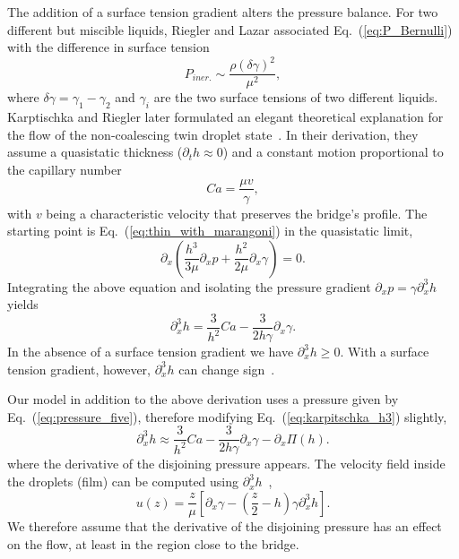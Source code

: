 The addition of a surface tension gradient alters the pressure balance.
For two different but miscible liquids, Riegler and Lazar associated Eq.~(\ref{eq:P_Bernulli}) with the difference in surface tension~\cite{doi:10.1021/la800630w}
\begin{equation}\label{eq:P_bernulli_riegler}
    P_{iner.} \sim \frac{\rho (\delta\gamma)^2}{\mu^2}, 
\end{equation}
where $\delta\gamma = \gamma_1 - \gamma_2$ and $\gamma_i$ are the two surface tensions of two different liquids. 
Karptischka and Riegler later formulated an elegant theoretical explanation for the flow of the non-coalescing twin droplet state~\cite{PhysRevLett.109.066103}.
In their derivation, they assume a quasistatic thickness ($\partial_t h \approx 0$) and a constant motion proportional to the capillary number 
\begin{equation}\label{eq:sys_cap_vel}
    Ca = \frac{\mu v}{\gamma},
\end{equation} 
with $v$ being a characteristic velocity that preserves the bridge's profile. 
The starting point is Eq.~(\ref{eq:thin_with_marangoni}) in the quasistatic limit, 
\begin{equation}\label{eq:pressure_noncoal}
    \partial_x\left(\frac{h^3}{3\mu}\partial_x p + \frac{h^2}{2\mu}\partial_x\gamma\right) = 0.
\end{equation}
Integrating the above equation and isolating the pressure gradient $\partial_x p = \gamma\partial_x^3 h$ yields~\cite{RevModPhys.69.931, PhysRevLett.109.066103}
\begin{equation}\label{eq:karpitschka_h3}
    \partial_x^3 h = \frac{3}{h^2}Ca - \frac{3}{2h\gamma}\partial_x\gamma.
\end{equation}
In the absence of a surface tension gradient we have $\partial_x^3 h \geq 0$.
With a surface tension gradient, however, $\partial_x^3 h$ can change sign~\cite{PhysRevLett.109.066103}.

Our model in addition to the above derivation uses a pressure given by Eq.~(\ref{eq:pressure_five}), therefore modifying Eq.~(\ref{eq:karpitschka_h3}) slightly, 
\begin{equation}\label{eq:stefan_h3}
    \partial_x^3 h \approx \frac{3}{h^2}Ca - \frac{3}{2h\gamma}\partial_x\gamma - \partial_x\Pi(h).
\end{equation}
where the derivative of the disjoining pressure appears. 
The velocity field inside the droplets (film) can be computed using $\partial_x^3 h$~\cite{RevModPhys.69.931},
\begin{equation}\label{eq:Oron_correct}
    u(z) = \frac{z}{\mu}\left[\partial_x\gamma - \left(\frac{z}{2} - h\right)\gamma\partial_x^3 h\right].
\end{equation}
We therefore assume that the derivative of the disjoining pressure has an effect on the flow, at least in the region close to the bridge.

